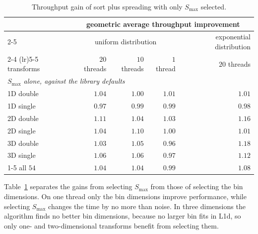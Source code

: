 \begin{table}[ht]
    \centering
    \small
    \begin{tabular}{lrrrr}
        \toprule
        & \multicolumn{4}{c}{geometric average throughput improvement} \\
        \cmidrule(lr){2-5}
        & \multicolumn{3}{c}{uniform distribution} & exponential distribution \\
        \cmidrule(lr){2-4} \cmidrule(lr){5-5}
        transforms & $20$ threads & $10$ threads & $1$ thread & $20$ threads \\
        \midrule
        \multicolumn{5}{l}{\emph{$S_{\max}$ alone, against the library defaults}} \\
        1D double & $1.04$ & $1.00$ & $1.01$ & $1.01$ \\
        1D single & $0.97$ & $0.99$ & $0.99$ & $0.98$ \\
        2D double & $1.11$ & $1.04$ & $1.03$ & $1.16$ \\
        2D single & $1.04$ & $1.10$ & $1.00$ & $1.01$ \\
        3D double & $1.03$ & $1.05$ & $0.96$ & $1.18$ \\
        3D single & $1.06$ & $1.06$ & $0.97$ & $1.12$ \\
        \cmidrule(lr){1-5}
        all $54$ & $1.04$ & $1.04$ & $0.99$ & $1.08$ \\
        \bottomrule
    \end{tabular}
    \caption{Throughput gain of sort plus spreading with only $S_{\max}$ selected.}
    \label{tab:selection_split}
\end{table}

Table~\ref{tab:selection_split} separates the gains from selecting $S_{\max}$ from those of selecting the bin dimensions. On one thread only the bin dimensions improve performance, while selecting $S_{\max}$ changes the time by no more than noise. In three dimensions the algorithm finds no better bin dimensions, because no larger bin fits in L1d, so only one- and two-dimensional transforms benefit from selecting them.


